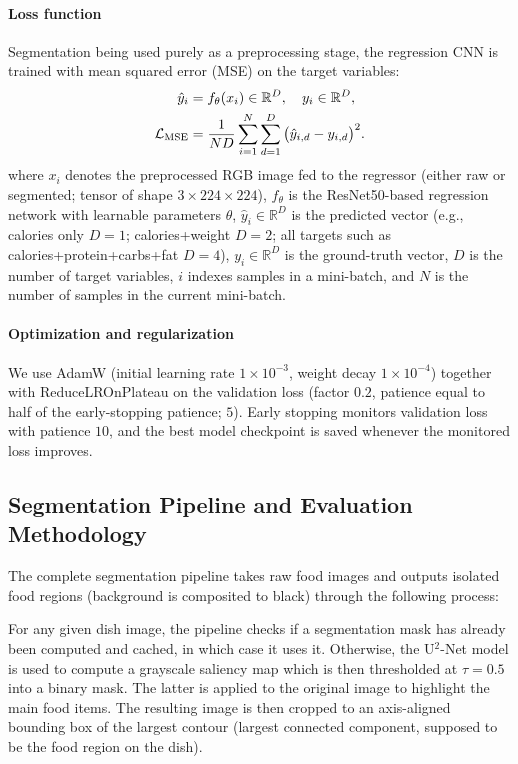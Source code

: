 \documentclass[a4paper]{article}
\begin{document}
        \paragraph{Loss function}
        Segmentation being used purely as a preprocessing stage, the regression CNN is trained with mean squared error (MSE) on the target variables:
        \begin{align}
            \hat{y}_i &= f_{\theta}(x_i) \in \mathbb{R}^D, \quad y_i \in \mathbb{R}^D, \\
            \mathcal{L}_{\mathrm{MSE}} &= \frac{1}{ND} \sum_{i=1}^{N} \sum_{d=1}^{D} \big{(\hat{y}_{i,d} - y_{i,d}\big)}^2.
        \end{align}
        where $x_i$ denotes the preprocessed RGB image fed to the regressor (either raw or segmented; tensor of shape $3\times224\times224$), $f_{\theta}$ is the ResNet50-based regression network with learnable parameters $\theta$, $\hat{y}_i\in\mathbb{R}^D$ is the predicted vector (e.g., calories only $D{=}1$; calories+weight $D{=}2$; all targets such as calories+protein+carbs+fat $D{=}4$), $y_i\in\mathbb{R}^D$ is the ground-truth vector, $D$ is the number of target variables, $i$ indexes samples in a mini-batch, and $N$ is the number of samples in the current mini-batch.
        
        \paragraph{Optimization and regularization}
        We use AdamW (initial learning rate $1\times10^{-3}$, weight decay $1\times10^{-4}$) together with ReduceLROnPlateau on the validation loss (factor $0.2$, patience equal to half of the early-stopping patience; $5$). Early stopping monitors validation loss with patience $10$, and the best model checkpoint is saved whenever the monitored loss improves.

        \subsection{Segmentation Pipeline and Evaluation Methodology}
        The complete segmentation pipeline takes raw food images and outputs isolated food regions (background is composited to black) through the following process:
        
        For any given dish image, the pipeline checks if a segmentation mask has already been computed and cached, in which case it uses it. Otherwise, the U$^2$-Net model is used to compute a grayscale saliency map which is then thresholded at $\tau{=}0.5$ into a binary mask. The latter is applied to the original image to highlight the main food items.
        The resulting image is then cropped to an axis-aligned bounding box of the largest contour (largest connected component, supposed to be the food region on the dish).
        
\end{document}
